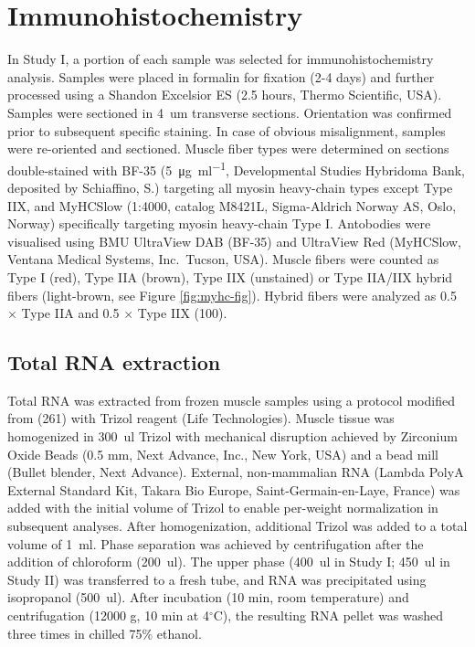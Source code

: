 \documentclass[twoside,10pt]{gihclass} %
\begin{document}
\hypertarget{immunohistochemistry}{%
\section{Immunohistochemistry}\label{immunohistochemistry}}

In Study I, a portion of each sample was selected for immunohistochemistry analysis. Samples were placed in formalin for fixation (2-4 days) and further processed using a Shandon Excelsior ES (2.5 hours, Thermo Scientific, USA). Samples were sectioned in \SI{4}{um} transverse sections. Orientation was confirmed prior to subsequent specific staining. In case of obvious misalignment, samples were re-oriented and sectioned. Muscle fiber types were determined on sections double-stained with BF-35 (\SI{5}{\micro\gram\per\milli\litre}, Developmental Studies Hybridoma Bank, deposited by Schiaffino, S.) targeting all myosin heavy-chain types except Type IIX, and MyHCSlow (1:4000, catalog M8421L, Sigma-Aldrich Norway AS, Oslo, Norway) specifically targeting myosin heavy-chain Type I.
Antobodies were visualised using BMU UltraView DAB (BF-35) and UltraView Red (MyHCSlow, Ventana Medical Systems, Inc.~Tucson, USA).
Muscle fibers were counted as Type I (red), Type IIA (brown), Type IIX (unstained) or Type IIA/IIX hybrid fibers (light-brown, see Figure \ref{fig:myhc-fig}). Hybrid fibers were analyzed as 0.5 \(\times\) Type IIA and 0.5 \(\times\) Type IIX
(100).

\hypertarget{total-rna-extraction}{%
\subsection{Total RNA extraction}\label{total-rna-extraction}}

Total RNA was extracted from frozen muscle samples using a protocol modified from
(261)
with Trizol reagent (Life Technologies).
Muscle tissue was homogenized in \SI{300}{ul} Trizol with mechanical disruption achieved by Zirconium Oxide Beads (0.5 mm, Next Advance, Inc., New York, USA) and a bead mill (Bullet blender, Next Advance). External, non-mammalian RNA (Lambda PolyA External Standard Kit, Takara Bio Europe, Saint-Germain-en-Laye, France) was added with the initial volume of Trizol to enable per-weight normalization in subsequent analyses. After homogenization, additional Trizol was added to a total volume of \SI{1}{ml}. Phase separation was achieved by centrifugation after the addition of chloroform (\SI{200}{ul}). The upper phase (\SI{400}{ul} in Study I; \SI{450}{ul} in Study II) was transferred to a fresh tube, and RNA was precipitated using isopropanol (\SI{500}{ul}). After incubation (10 min, room temperature) and centrifugation (12000 g, 10 min at 4\(^{\circ}\)C), the resulting RNA pellet was washed three times in chilled 75\% ethanol.
\end{document}
